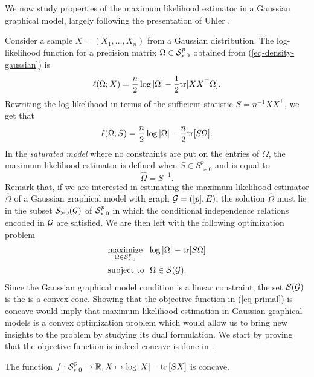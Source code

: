 We now study properties of the maximum likelihood estimator in a Gaussian graphical model, largely following the presentation of Uhler \cite[Section 9]{maathuis2018handbook}.

Consider a sample $X = (X_1, \ldots, X_n)$ from a Gaussian distribution. The log-likelihood function for a precision matrix $\Omega \in \S^p_{\succ 0}$ obtained from (\ref{eq-density-gaussian}) is
\begin{equation*}
    \ell(\Omega; X) = \frac{n}{2} \log |\Omega| - \frac{1}{2}\tr[XX^\top\Omega].
\end{equation*}
Rewriting the log-likelihood in terms of the sufficient statistic $S = n^{-1}XX^\top$, we get that
\begin{equation} \label{eq-likelihood}
    \ell(\Omega; S) = \frac{n}{2}\log |\Omega| - \frac{n}{2}\tr[S\Omega].
\end{equation}
In the \textit{saturated model} where no constraints are put on the entries of $\Omega$, the maximum likelihood estimator is defined when $S \in S^p_{\succ 0}$ and is equal to
\begin{equation*}
    \hat\Omega = S^{-1}.
\end{equation*}
Remark that, if we are interested in estimating the maximum likelihood estimator $\hat\Omega$ of a Gaussian graphical model with graph $\G = ([p], E)$, the solution $\hat\Omega$ must lie in the subset $\S_{\succ 0}(\G)$ of $\S^p_{\succ 0}$ in which the conditional independence relations encoded in $\G$ are satisfied. We are then left with the following optimization problem
\begin{align} \label{eq-primal}
    \begin{split}
        &\underset{\Omega \in \S^p_{\succ 0}}{\t{maximize}}\ \  \log |\Omega| - \tr[S\Omega]\\
        &\t{subject to}\ \ \Omega \in \S(\G).
    \end{split}
\end{align}
Since the Gaussian graphical model condition is a linear constraint, the set $\S(\G)$ is the is a convex cone. Showing that the objective function in (\ref{eq-primal}) is concave would imply that maximum likelihood estimation in Gaussian graphical models is a convex optimization problem which would allow us to bring new insights to the problem by studying its dual formulation. We start by proving that the objective function is indeed concave is done in \cite[Proposition 9.2.1]{maathuis2018handbook}.
\begin{lemma}
    The function $f : \S^p_{\succ 0} \rightarrow \R, X \mapsto \log |X| - \trB{SX}$ is concave.
\end{lemma}
